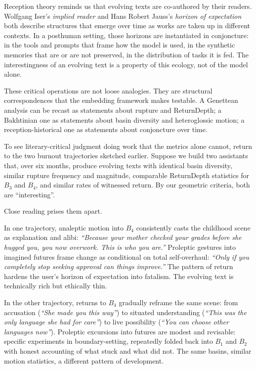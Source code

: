 Reception theory reminds us that evolving texts are co-authored by their readers. Wolfgang Iser's \emph{implied reader} and Hans Robert Jauss's \emph{horizon of expectation} both describe structures that emerge over time as works are taken up in different contexts.\cite{iser1978,jauss1982} In a posthuman setting, those horizons are instantiated in conjoncture: in the tools and prompts that frame how the model is used, in the synthetic memories that are or are not preserved, in the distribution of tasks it is fed. The interestingness of an evolving text is a property of this ecology, not of the model alone.

These critical operations are not loose analogies. They are structural correspondences that the embedding framework makes testable. A Genettean analysis can be recast as statements about rupture and ReturnDepth; a Bakhtinian one as statements about basin diversity and heteroglossic motion; a reception-historical one as statements about conjoncture over time.

To see literary-critical judgment doing work that the metrics alone cannot, return to the two burnout trajectories sketched earlier. Suppose we build two assistants that, over six months, produce evolving texts with identical basin diversity, similar rupture frequency and magnitude, comparable ReturnDepth statistics for $B_3$ and $B_4$, and similar rates of witnessed return. By our geometric criteria, both are ``interesting''.

Close reading prises them apart.

In one trajectory, analeptic motion into $B_4$ consistently casts the childhood scene as explanation and alibi: \emph{``Because your mother checked your grades before she hugged you, you now overwork. This is who you are.''} Proleptic gestures into imagined futures frame change as conditional on total self-overhaul: \emph{``Only if you completely stop seeking approval can things improve.''} The pattern of return hardens the user's horizon of expectation into fatalism. The evolving text is technically rich but ethically thin.

In the other trajectory, returns to $B_4$ gradually reframe the same scene: from accusation (\emph{``She made you this way''}) to situated understanding (\emph{``This was the only language she had for care''}) to live possibility (\emph{``You can choose other languages now''}). Proleptic excursions into futures are modest and revisable: specific experiments in boundary-setting, repeatedly folded back into $B_1$ and $B_2$ with honest accounting of what stuck and what did not. The same basins, similar motion statistics, a different pattern of development.

